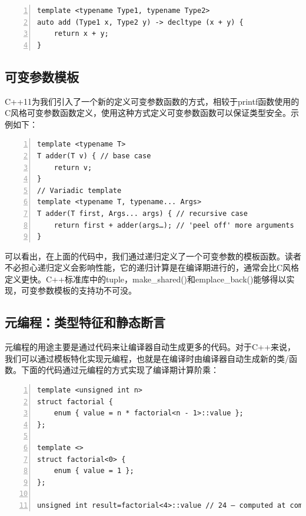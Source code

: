 \documentclass{ctexart}
\begin{document}
\begin{lstlisting}[language={[ANSI]C},keywordstyle=\color{blue!70},commentstyle=\color{red!50!green!50!blue!50},frame=shadowbox, rulesepcolor=\color{red!20!green!20!blue!20},basicstyle=\small,numbers=left, numberstyle=\tiny,breaklines=true]
template <typename Type1, typename Type2>  
auto add (Type1 x, Type2 y) -> decltype (x + y) {  
	return x + y;  
}
\end{lstlisting}

\subsection{可变参数模板}

C++11为我们引入了一个新的定义可变参数函数的方式，相较于printf函数使用的C风格可变参数函数定义，使用这种方式定义可变参数函数可以保证类型安全。示例如下：

\begin{lstlisting}[language={[ANSI]C},keywordstyle=\color{blue!70},commentstyle=\color{red!50!green!50!blue!50},frame=shadowbox, rulesepcolor=\color{red!20!green!20!blue!20},basicstyle=\small,numbers=left, numberstyle=\tiny,breaklines=true]
template <typename T>  
T adder(T v) { // base case  
	return v;  
}  
// Variadic template  
template <typename T, typename... Args>  
T adder(T first, Args... args) { // recursive case  
	return first + adder(args…); // 'peel off' more arguments  
}
\end{lstlisting}

可以看出，在上面的代码中，我们通过递归定义了一个可变参数的模板函数。读者不必担心递归定义会影响性能，它的递归计算是在编译期进行的，通常会比C风格定义更快。C++标准库中的tuple，make\_shared()和emplace\_back()能够得以实现，可变参数模板的支持功不可没。

\subsection{元编程：类型特征和静态断言}

元编程的用途主要是通过代码来让编译器自动生成更多的代码。对于C++来说，我们可以通过模板特化实现元编程，也就是在编译时由编译器自动生成新的类/函数。下面的代码通过元编程的方式实现了编译期计算阶乘：

\begin{lstlisting}[language={[ANSI]C},keywordstyle=\color{blue!70},commentstyle=\color{red!50!green!50!blue!50},frame=shadowbox, rulesepcolor=\color{red!20!green!20!blue!20},basicstyle=\small,numbers=left, numberstyle=\tiny,breaklines=true]
template <unsigned int n>  
struct factorial {  
	enum { value = n * factorial<n - 1>::value };
};  

template <>  
struct factorial<0> {  
	enum { value = 1 };
};  

unsigned int result=factorial<4>::value // 24 – computed at compile time!
\end{lstlisting}
\end{document}
